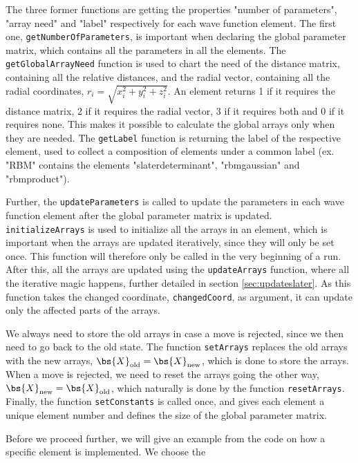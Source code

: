 The three former functions are getting the properties "number of parameters", "array need" and "label" respectively for each wave function element. The first one, \texttt{getNumberOfParameters}, is important when declaring the global parameter matrix, which contains all the parameters in all the elements. The \texttt{getGlobalArrayNeed} function is used to chart the need of the distance matrix, containing all the relative distances, and the radial vector, containing all the radial coordinates, $r_i=\sqrt{x_i^2+y_i^2+z_i^2}$. An element returns 1 if it requires the distance matrix, 2 if it requires the radial vector, 3 if it requires both and 0 if it requires none. This makes it possible to calculate the global arrays only when they are needed. The \texttt{getLabel} function is returning the label of the respective element, used to collect a composition of elements under a common label (ex. "RBM" contains the elements "slaterdeterminant", "rbmgaussian" and "rbmproduct").

Further, the \texttt{updateParameters} is called to update the parameters in each wave function element after the global parameter matrix is updated. \texttt{initializeArrays} is used to initialize all the arrays in an element, which is important when the arrays are updated iteratively, since they will only be set once. This function will therefore only be called in the very beginning of a run. After this, all the arrays are updated using the \texttt{updateArrays} function, where all the iterative magic happens, further detailed in section \ref{sec:updateslater}. As this function takes the changed coordinate, \texttt{changedCoord}, as argument, it can update only the affected parts of the arrays. 

We always need to store the old arrays in case a move is rejected, since we then need to go back to the old state. The function \texttt{setArrays} replaces the old arrays with the new arrays, $\bs{X}_{\text{old}}=\bs{X}_{\text{new}}$, which is done to store the arrays. When a move is rejected, we need to reset the arrays going the other way, $\bs{X}_{\text{new}}=\bs{X}_{\text{old}}$, which naturally is done by the function \texttt{resetArrays}. Finally, the function \texttt{setConstants} is called once, and gives each element a unique element number and defines the size of the global parameter matrix. 

Before we proceed further, we will give an example from the code on how a specific element is implemented. We choose the 

